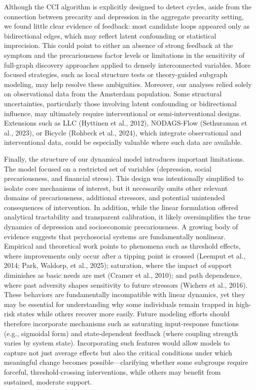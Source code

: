 \documentclass[
]{article}
\begin{document}
Although the CCI algorithm is explicitly designed to detect cycles,
aside from the connection between precarity and depression in the
aggregate precarity setting, we found little clear evidence of feedback:
most candidate loops appeared only as bidirectional edges, which may
reflect latent confounding or statistical imprecision. This could point
to either an absence of strong feedback at the symptom and the
precariousness factor levels or limitations in the sensitivity of
full-graph discovery approaches applied to densely interconnected
variables. More focused strategies, such as local structure tests or
theory-guided subgraph modeling, may help resolve these ambiguities.
Moreover, our analyses relied solely on observational data from the
Amsterdam population. Some structural uncertainties, particularly those
involving latent confounding or bidirectional influence, may ultimately
require interventional or semi-interventional designs. Extensions such
as LLC (Hyttinen et al., 2012), NODAGS-Flow (Sethuraman et al., 2023),
or Bicycle (Rohbeck et al., 2024), which integrate observational and
interventional data, could be especially valuable where such data are
available.

Finally, the structure of our dynamical model introduces important
limitations. The model focused on a restricted set of variables
(depression, social precariousness, and financial stress). This design
was intentionally simplified to isolate core mechanisms of interest, but
it necessarily omits other relevant domains of precariousness,
additional stressors, and potential unintended consequences of
intervention. In addition, while the linear formulation offered
analytical tractability and transparent calibration, it likely
oversimplifies the true dynamics of depression and socioeconomic
precariousness. A growing body of evidence suggests that psychosocial
systems are fundamentally nonlinear. Empirical and theoretical work
points to phenomena such as threshold effects, where improvements only
occur after a tipping point is crossed (Leemput et al., 2014; Park,
Waldorp, et al., 2025); saturation, where the impact of support
diminishes as basic needs are met (Cramer et al., 2010); and path
dependence, where past adversity shapes sensitivity to future stressors
(Wichers et al., 2016). These behaviors are fundamentally incompatible
with linear dynamics, yet they may be essential for understanding why
some individuals remain trapped in high-risk states while others recover
more easily. Future modeling efforts should therefore incorporate
mechanisms such as saturating input-response functions (e.g., sigmoidal
form) and state-dependent feedback (where coupling strength varies by
system state). Incorporating such features would allow models to capture
not just average effects but also the critical conditions under which
meaningful change becomes possible---clarifying whether some subgroups
require forceful, threshold-crossing interventions, while others may
benefit from sustained, moderate support.
\end{document}
